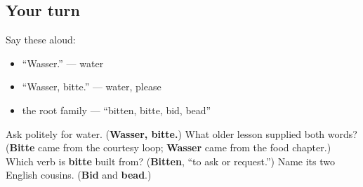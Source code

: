 \subsection*{Your turn}
Say these aloud:

\begin{itemize}
\raggedright
  \item “Wasser.” — water
  \item “Wasser, bitte.” — water, please
  \item the root family — “bitten, bitte, bid, bead”
\end{itemize}

\begin{tcolorbox}[breakable,colback=teal!4,colframe=teal!35!black,title={Before you move on}]
Ask politely for water. (\textbf{Wasser, bitte.}) What older lesson supplied both words? (\textbf{Bitte} came from the courtesy loop; \textbf{Wasser} came from the food chapter.) Which verb is \textbf{bitte} built from? (\textbf{Bitten}, “to ask or request.”) Name its two English cousins. (\textbf{Bid} and \textbf{bead}.)
\end{tcolorbox}
